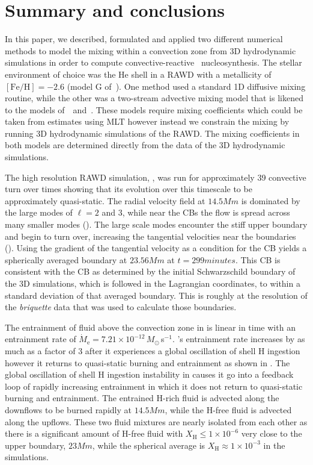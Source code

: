 \documentclass[fleqn,usenatbib]{mnras}
\newcommand{\cldfluid}{fluid above the convection zone}
\newcommand{\ppmstar}{\code{PPMstar}}
\begin{document}
\section{Summary and conclusions}
\label{sec:conclusions}

In this paper, we described, formulated and applied two different numerical
methods to model the mixing within a convection zone from 3D hydrodynamic
simulations in order to compute convective-reactive \ipr~nucleosynthesis. The
stellar environment of choice was the He shell in a RAWD with a metallicity of
$\mathrm{[Fe/H]} = -2.6$ (model G of~\citet{Denissenkov:19}). One method used a
standard 1D diffusive mixing routine, while the other was a two-stream advective
mixing model that is likened to the models
of~\citet{cannon1993}~and~\citet{Henkel2017}. These models require mixing
coefficients which could be taken from estimates using MLT however instead we
constrain the mixing by running 3D hydrodynamic simulations of the RAWD. The
mixing coefficients in both models are determined directly from the data of the
3D hydrodynamic simulations.

The high resolution RAWD simulation, , was run for approximately 39
convective turn over times showing that its evolution over this timescale to be
approximately quasi-static. The radial velocity field at $\unit{14.5}{Mm}$ is
dominated by the large modes of $\ell = 2$ and $3$, while near the CBs the flow
is spread across many smaller modes (). The
large scale modes encounter the stiff upper boundary and begin to turn over,
increasing the tangential velocities near the boundaries (). Using
the gradient of the tangential velocity as a condition for the CB yields a
spherically averaged boundary at $\unit{23.56}{Mm}$ at $t =
\unit{299}{minutes}$. This CB is consistent with the CB as determined by the
initial Schwarzschild boundary of the 3D simulations, which is followed in the
Lagrangian coordinates, to within a standard deviation of that averaged
boundary. This is roughly at the resolution of the \textit{briquette} data that
was used to calculate those boundaries.

The entrainment of \cldfluid{} in  is linear in time with an
entrainment rate of $\dot{M}_{\mathrm{e}} = 7.21 \times
10^{-12}\,M_{\odot}$\,s$^{-1}$. 's entrainment rate increases by as
much as a factor of 3 after it experiences a global oscillation of shell H ingestion however it returns to
quasi-static burning and entrainment as shown in . The global oscillation of shell H ingestion
instability in  causes it go into a feedback loop of rapidly
increasing entrainment in which it does not return to quasi-static burning and
entrainment. The entrained H-rich fluid is advected along the downflows to be
burned rapidly at $\unit{14.5}{Mm}$, while the H-free fluid is advected along the
upflows. These two fluid mixtures are nearly isolated from each other as there
is a significant amount of H-free fluid with $X_{\mathrm{H}} \leq
1\times10^{-6}$ very close to the upper boundary, $\unit{23}{Mm}$, while the
spherical average is $X_{\mathrm{H}} \approx 1\times10^{-3}$ in the \ppmstar{}
simulations.
\end{document}
